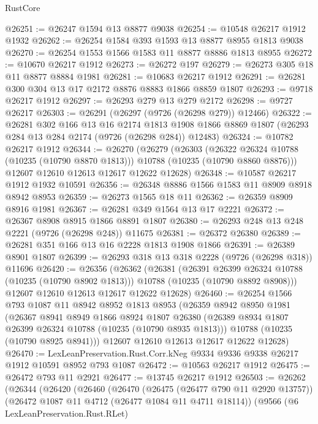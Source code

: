 \begin{lexlean}{RustCore}
\begin{coremodule}
@26251 := @26247 @1594 @13 @8877 @9038
@26254 := @10548 @26217 @1912 @1932
@26262 := @26254 @1584 @393 @1593 @13 @8877 @8955 @1813 @9038
@26270 := @26254 @1553 @1566 @1583 @11 @8877 @8886 @1813 @8955
@26272 := @10670 @26217 @1912
@26273 := @26272 @197
@26279 := @26273 @305 @18 @11 @8877 @8884 @1981
@26281 := @10683 @26217 @1912
@26291 := @26281 @300 @304 @13 @17 @2172 @8876 @8883 @1866 @8859 @1807
@26293 := @9718 @26217 @1912
@26297 := @26293 @279 @13 @279 @2172
@26298 := @9727 @26217
@26303 := @26291 (@26297 (@9726 (@26298 @279)) @12466)
@26322 := @26281
    @302
    @166
    @13
    @16
    @2174
    @1813
    @1908
    @1866
    @8869
    @1807
    (@26293 @284 @13 @284 @2174 (@9726 (@26298 @284)) @12483)
@26324 := @10782 @26217 @1912
@26344 := @26270
    (@26279
      (@26303
        (@26322 @26324 @10788 (@10235 (@10790 @8870 @1813)))
        @10788
        (@10235 (@10790 @8860 @8876)))
      @12607
      @12610
      @12613
      @12617
      @12622
      @12628)
@26348 := @10587 @26217 @1912 @1932 @10591
@26356 := @26348 @8886 @1566 @1583 @11 @8909 @8918 @8942 @8953
@26359 := @26273 @1565 @18 @11
@26362 := @26359 @8909 @8916 @1981
@26367 := @26281 @349 @1564 @13 @17 @2221
@26372 := @26367 @8908 @8915 @1866 @8891 @1807
@26380 := @26293 @248 @13 @248 @2221 (@9726 (@26298 @248)) @11675
@26381 := @26372 @26380
@26389 := @26281 @351 @166 @13 @16 @2228 @1813 @1908 @1866
@26391 := @26389 @8901 @1807
@26399 := @26293 @318 @13 @318 @2228 (@9726 (@26298 @318)) @11696
@26420 := @26356
    (@26362
      (@26381
        (@26391 @26399 @26324 @10788 (@10235 (@10790 @8902 @1813)))
        @10788
        (@10235 (@10790 @8892 @8908)))
      @12607
      @12610
      @12613
      @12617
      @12622
      @12628)
@26460 := @26254
    @1566
    @793
    @1087
    @11
    @8942
    @8952
    @1813
    @8953
    (@26359
      @8942
      @8950
      @1981
      (@26367
        @8941
        @8949
        @1866
        @8924
        @1807
        @26380
        (@26389 @8934 @1807 @26399 @26324 @10788 (@10235 (@10790 @8935 @1813)))
        @10788
        (@10235 (@10790 @8925 @8941)))
      @12607
      @12610
      @12613
      @12617
      @12622
      @12628)
@26470 := LexLeanPreservation.Rust.Corr.kNeg @9334 @9336 @9338 @26217 @1912 @10591 @8952 @793 @1087
@26472 := @10563 @26217 @1912
@26475 := @26472 @793 @11 @2921
@26477 := @13745 @26217 @1912
@26503 := @26262
    (@26344
      (@26420
        (@26460
          (@26470
            (@26475 (@26477 @790 @11 @2920 @13757))
            (@26472 @1087 @11 @4712 (@26477 @1084 @11 @4711 @18114))
            (@9566
              (@6 LexLeanPreservation.Rust.RLet)

\end{coremodule}
\end{lexlean}
